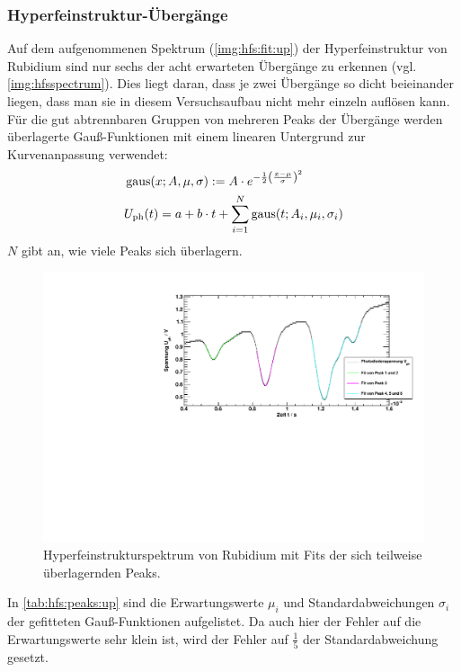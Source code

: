 \subsubsection*{Hyperfeinstruktur-Übergänge}
Auf dem aufgenommenen Spektrum (\autoref{img:hfs:fit:up}) der Hyperfeinstruktur von Rubidium sind nur sechs der acht erwarteten
Übergänge zu erkennen (vgl. \autoref{img:hfsspectrum}). Dies liegt daran, dass je zwei Übergänge so dicht beieinander liegen,
dass man sie in diesem Versuchsaufbau nicht mehr
einzeln auflösen kann. Für die gut abtrennbaren Gruppen von
mehreren Peaks der Übergänge werden überlagerte Gauß-Funktionen mit einem linearen Untergrund zur Kurvenanpassung verwendet:
\begin{equation}
    \begin{split}
        & \operatorname{gaus}(x; A, \mu, \sigma) := A \cdot e^{-\frac{1}{2} \left( \frac{x-\mu}{\sigma} \right)^2} \\
        & U_\text{ph}(t) = a + b \cdot t + \sum_{i=1}^N \operatorname{gaus}(t; A_i, \mu_i, \sigma_i)
    \end{split}
\end{equation}
$N$ gibt an, wie viele Peaks sich überlagern.
\begin{figure}[H]
\begin{center}
    \includegraphics[width=\textwidth]{../img/part2/up-hfs_zoom_fit.pdf}
    \caption{Hyperfeinstrukturspektrum von Rubidium mit Fits der sich teilweise überlagernden Peaks.}
    \label{img:hfs:fit:up}
\end{center}
\end{figure}
In \autoref{tab:hfs:peaks:up} sind die Erwartungswerte $\mu_i$ und Standardabweichungen $\sigma_i$ der gefitteten Gauß-Funktionen aufgelistet. 
Da auch hier der Fehler auf die Erwartungswerte sehr klein ist, wird der Fehler auf $\frac{1}{5}$ der Standardabweichung gesetzt.


